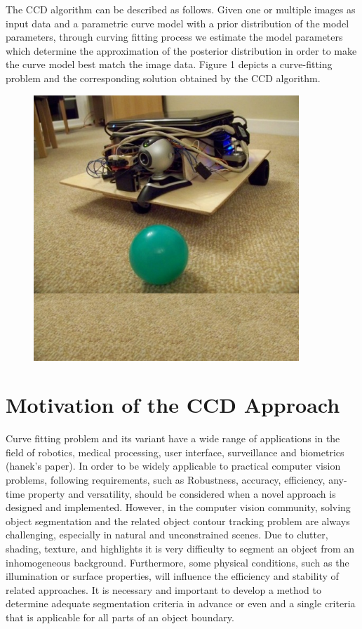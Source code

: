 The CCD algorithm can be described as follows. Given one or multiple images as input
data and a parametric curve model with a prior distribution of the model
parameters, through curving fitting process we estimate the model
parameters which determine the approximation of the posterior
distribution in order to make the curve model best match the image data.
Figure 1 depicts a curve-fitting problem and the corresponding solution obtained by the
CCD algorithm. 
\begin{figure}[htb]
  \centering
  \includegraphics[width=10cm]{images/ball.png}
  \caption{\label{fig:1}}
\end{figure}



\section{Motivation of the CCD Approach}
\label{sec:mccd}
Curve fitting problem and its variant have a wide range of
applications in the field of robotics, medical processing, user
interface, surveillance and biometrics (hanek's paper). In order to be
widely applicable to practical computer vision problems, following
requirements, such as Robustness,
accuracy, efficiency, any-time property and versatility, should be
considered when a novel approach is designed and implemented.
However, in the computer vision community, solving object segmentation and the
related object contour tracking problem are always challenging, especially in natural and unconstrained scenes. Due to clutter,
shading, texture, and highlights it is very difficulty to segment
an object from an inhomogeneous background. Furthermore, some physical
conditions, such as the illumination or surface properties, will
influence the efficiency and stability of related approaches. It is
necessary and important to develop a method to determine adequate segmentation
criteria in advance or even and a single criteria that is applicable
for all parts of an object boundary.

